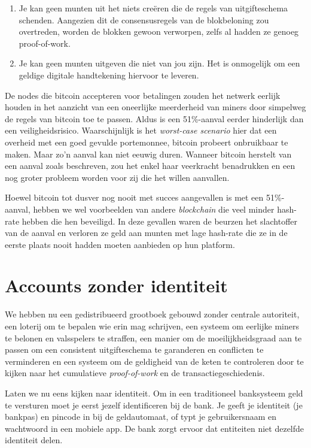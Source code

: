 \documentclass[
  letterpaper,
]{scrbook}
\begin{document}
\begin{enumerate}
\def\labelenumi{\arabic{enumi}.}
\item
  Je kan geen munten uit het niets creëren die de regels van
  uitgifteschema schenden. Aangezien dit de consensusregels van de
  blokbeloning zou overtreden, worden de blokken gewoon verworpen, zelfs
  al hadden ze genoeg proof-of-work.
\item
  Je kan geen munten uitgeven die niet van jou zijn. Het is onmogelijk
  om een geldige digitale handtekening hiervoor te leveren.
\end{enumerate}

De nodes die bitcoin accepteren voor betalingen zouden het netwerk
eerlijk houden in het aanzicht van een oneerlijke meerderheid van miners
door simpelweg de regels van bitcoin toe te passen. Aldus is een
51\%-aanval eerder hinderlijk dan een veiligheidsrisico. Waarschijnlijk
is het \emph{worst-case scenario} hier dat een overheid met een goed
gevulde portemonnee, bitcoin probeert onbruikbaar te maken. Maar zo'n
aanval kan niet eeuwig duren. Wanneer bitcoin herstelt van een aanval
zoals beschreven, zou het enkel haar veerkracht benadrukken en een nog
groter probleem worden voor zij die het willen aanvallen.

Hoewel bitcoin tot dusver nog nooit met succes aangevallen is met een
51\%-aanval, hebben we wel voorbeelden van andere \emph{blockchain} die
veel minder hash-rate hebben die hen beveiligd. In deze gevallen waren
de beurzen het slachtoffer van de aanval en verloren ze geld aan munten
met lage hash-rate die ze in de eerste plaats nooit hadden moeten
aanbieden op hun platform.

\hypertarget{accounts-zonder-identiteit}{%
\chapter{Accounts zonder identiteit}\label{accounts-zonder-identiteit}}

We hebben nu een gedistribueerd grootboek gebouwd zonder centrale
autoriteit, een loterij om te bepalen wie erin mag schrijven, een
systeem om eerlijke miners te belonen en valsspelers te straffen, een
manier om de moeilijkheidsgraad aan te passen om een consistent
uitgifteschema te garanderen en conflicten te verminderen en een systeem
om de geldigheid van de keten te controleren door te kijken naar het
cumulatieve \emph{proof-of-work} en de transactiegeschiedenis.

Laten we nu eens kijken naar identiteit. Om in een traditioneel
banksysteem geld te versturen moet je eerst jezelf identificeren bij de
bank. Je geeft je identiteit (je bankpas) en pincode in bij de
geldautomaat, of typt je gebruikersnaam en wachtwoord in een mobiele
app. De bank zorgt ervoor dat entiteiten niet dezelfde identiteit delen.
\end{document}

